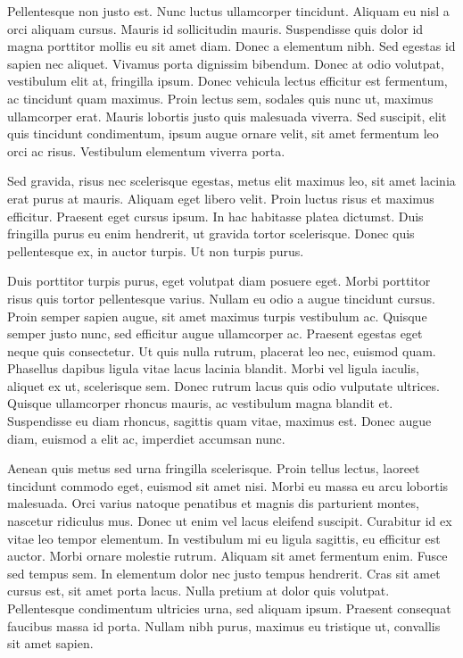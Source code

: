 Pellentesque non justo est. Nunc luctus ullamcorper tincidunt. Aliquam eu nisl a
orci aliquam cursus. Mauris id sollicitudin mauris. Suspendisse quis dolor id
magna porttitor mollis eu sit amet diam. Donec a elementum nibh. Sed egestas id
sapien nec aliquet. Vivamus porta dignissim bibendum. Donec at odio volutpat,
vestibulum elit at, fringilla ipsum. Donec vehicula lectus efficitur est
fermentum, ac tincidunt quam maximus. Proin lectus sem, sodales quis nunc ut,
maximus ullamcorper erat. Mauris lobortis justo quis malesuada viverra. Sed
suscipit, elit quis tincidunt condimentum, ipsum augue ornare velit, sit amet
fermentum leo orci ac risus. Vestibulum elementum viverra porta.

Sed gravida, risus nec scelerisque egestas, metus elit maximus leo, sit amet
lacinia erat purus at mauris. Aliquam eget libero velit. Proin luctus risus et
maximus efficitur. Praesent eget cursus ipsum. In hac habitasse platea dictumst.
Duis fringilla purus eu enim hendrerit, ut gravida tortor scelerisque. Donec
quis pellentesque ex, in auctor turpis. Ut non turpis purus.

Duis porttitor turpis purus, eget volutpat diam posuere eget. Morbi porttitor
risus quis tortor pellentesque varius. Nullam eu odio a augue tincidunt cursus.
Proin semper sapien augue, sit amet maximus turpis vestibulum ac. Quisque semper
justo nunc, sed efficitur augue ullamcorper ac. Praesent egestas eget neque quis
consectetur. Ut quis nulla rutrum, placerat leo nec, euismod quam. Phasellus
dapibus ligula vitae lacus lacinia blandit. Morbi vel ligula iaculis, aliquet ex
ut, scelerisque sem. Donec rutrum lacus quis odio vulputate ultrices. Quisque
ullamcorper rhoncus mauris, ac vestibulum magna blandit et. Suspendisse eu diam
rhoncus, sagittis quam vitae, maximus est. Donec augue diam, euismod a elit ac,
imperdiet accumsan nunc.

Aenean quis metus sed urna fringilla scelerisque. Proin tellus lectus, laoreet
tincidunt commodo eget, euismod sit amet nisi. Morbi eu massa eu arcu lobortis
malesuada. Orci varius natoque penatibus et magnis dis parturient montes,
nascetur ridiculus mus. Donec ut enim vel lacus eleifend suscipit. Curabitur id
ex vitae leo tempor elementum. In vestibulum mi eu ligula sagittis, eu efficitur
est auctor. Morbi ornare molestie rutrum. Aliquam sit amet fermentum enim. Fusce
sed tempus sem. In elementum dolor nec justo tempus hendrerit. Cras sit amet
cursus est, sit amet porta lacus. Nulla pretium at dolor quis volutpat.
Pellentesque condimentum ultricies urna, sed aliquam ipsum. Praesent consequat
faucibus massa id porta. Nullam nibh purus, maximus eu tristique ut, convallis
sit amet sapien.

